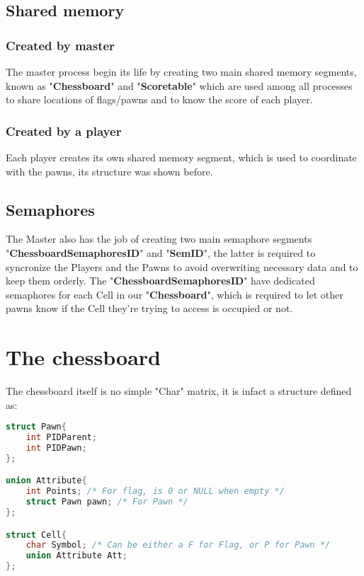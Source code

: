 \documentclass[11pt]{article}
\begin{document}
\subsection{Shared memory}

\subsubsection{Created by master}

The master process begin its life by creating two main shared memory segments, known as "\textbf{Chessboard}" and "\textbf{Scoretable}" which are used among all processes to share locations of flags/pawns and to know the score of each player.

\subsubsection{Created by a player}
Each player creates its own shared memory segment, which is used to coordinate with the pawns, its structure was shown before.

\subsection{Semaphores} The Master also has the job of creating two main semaphore segments "\textbf{ChessboardSemaphoresID}" and "\textbf{SemID}", the latter is required to syncronize the Players and the Pawns to avoid overwriting necessary data and to keep them orderly. The "\textbf{ChessboardSemaphoresID}" have dedicated semaphores for each Cell in our "\textbf{Chessboard}", which is required to let other pawns know if the Cell they're trying to access is occupied or not.



\section{The chessboard}

The chessboard itself is no simple "Char" matrix, it is infact a structure defined as:

	\begin{lstlisting}[language=C]
struct Pawn{
	int PIDParent;
	int PIDPawn;
};

union Attribute{
	int Points; /* For flag, is 0 or NULL when empty */
	struct Pawn pawn; /* For Pawn */
};

struct Cell{
	char Symbol; /* Can be either a F for Flag, or P for Pawn */
	union Attribute Att;
};
    \end{lstlisting}
    
\end{document}
